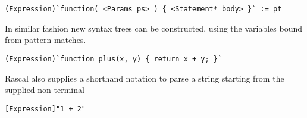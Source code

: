 \begin{lstlisting}
(Expression)`function( <Params ps> ) { <Statement* body> }` := pt
\end{lstlisting}

In similar fashion new syntax trees can be constructed, using the variables bound from pattern matches.

\begin{lstlisting}
(Expression)`function plus(x, y) { return x + y; }`
\end{lstlisting}

Rascal also supplies a shorthand notation to parse a string starting from the supplied non-terminal

\begin{lstlisting}
[Expression]"1 + 2"
\end{lstlisting}